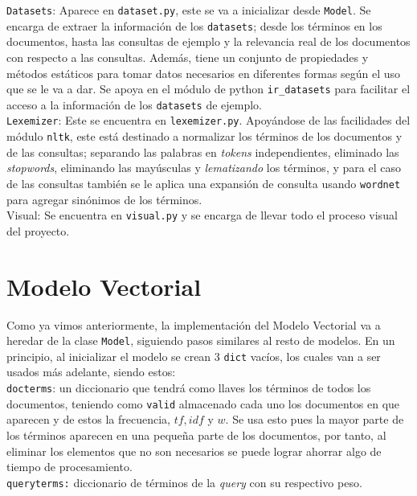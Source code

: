 \documentclass[spanish]{article}
\begin{document}
		\texttt{Datasets}: Aparece en \texttt{dataset.py}, este se va a inicializar desde \texttt{Model}. Se encarga de extraer la información de los \texttt{datasets}; desde los términos en los documentos, hasta las consultas de ejemplo y la relevancia real de los documentos con respecto a las consultas. Además, tiene un conjunto de propiedades y métodos estáticos para tomar datos necesarios en diferentes formas según el uso que se le va a dar. Se apoya en el módulo de python \texttt{ir\_datasets} para facilitar el acceso a la información de los \texttt{datasets} de ejemplo.\\

		\texttt{Lexemizer}: Este se encuentra en \texttt{lexemizer.py}. Apoyándose de las facilidades del módulo \texttt{nltk}, este está destinado a normalizar los términos de los documentos y de las consultas; separando las palabras en \emph{tokens} independientes, eliminado las \emph{stopwords}, eliminando las mayúsculas y \emph{lematizando} los términos, y para el caso de las consultas también se le aplica una expansión de consulta usando \texttt{wordnet} para agregar sinónimos de los términos.\\

		Visual: Se encuentra en \texttt{visual.py} y se encarga de llevar todo el proceso visual del proyecto.
	
	\section*{Modelo Vectorial}

		Como ya vimos anteriormente, la implementación del Modelo Vectorial va a heredar de la clase \texttt{Model}, siguiendo pasos similares al resto de modelos. En un principio, al inicializar el modelo se crean 3 \texttt{dict} vacíos, los cuales van a ser usados más adelante, siendo estos:\\

		\texttt{docterms}: un diccionario que tendrá como llaves los términos de todos los documentos, teniendo como \texttt{valid} almacenado cada uno los documentos en que aparecen y de estos la frecuencia, $ tf, idf $ y $ w $. Se usa esto pues la mayor parte de los términos aparecen en una pequeña parte de los documentos, por tanto, al eliminar los elementos que no son necesarios se puede lograr ahorrar algo de tiempo de procesamiento.\\

		\texttt{queryterms:} diccionario de términos de la \emph{query} con su respectivo peso.\\
		
\end{document}
